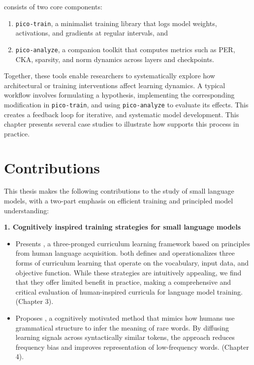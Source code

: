 \begin{itemize}
    \pico consists of two core components:
    
    \begin{enumerate}
        \item \texttt{pico-train}, a minimalist training library that logs model weights, activations, and gradients at regular intervals, and
        
        \item \texttt{pico-analyze}, a companion toolkit that computes metrics such as PER, CKA, sparsity, and norm dynamics across layers and checkpoints.
    \end{enumerate}

    Together, these tools enable researchers to systematically explore how architectural or training interventions affect learning dynamics. A typical workflow involves formulating a hypothesis, implementing the corresponding modification in \texttt{pico-train}, and using \texttt{pico-analyze} to evaluate its effects. This creates a feedback loop for iterative, and systematic model development. This chapter presents several case studies to illustrate how \pico supports this process in practice.

\end{itemize}

\section*{Contributions}

This thesis makes the following contributions to the study of small language models, with a two-part emphasis on efficient training and principled model understanding:

\vspace{1em}

\textbf{1. Cognitively inspired training strategies for small language models}

\begin{itemize}

    \item Presents \climb, a three-pronged curriculum learning framework based on principles from human language acquisition. \climb both defines and operationalizes three forms of curriculum learning that operate on the vocabulary, input data, and objective function. While these strategies are intuitively appealing, we find that they offer limited benefit in practice, making \climb a comprehensive and critical evaluation of human-inspired curricula for language model training. (Chapter 3).

    \item Proposes \smoothing, a cognitively motivated method that mimics how humans use grammatical structure to infer the meaning of rare words. By diffusing learning signals across syntactically similar tokens, the approach reduces frequency bias and improves representation of low-frequency words. (Chapter 4).

\end{itemize}

